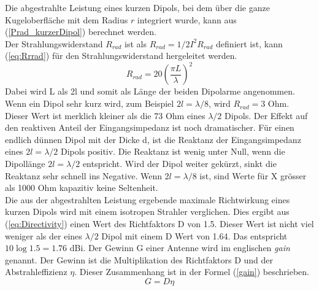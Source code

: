 Die abgestrahlte Leistung eines kurzen Dipols, bei dem über die ganze Kugeloberfläche mit dem Radius $r$ integriert wurde, kann aus  (\ref{Prad_kurzerDipol}) berechnet werden\cite{elliott1981antenna}.\\
Der Strahlungswiderstand $R_{rad}$ ist als $R_{rad}=1/2 I^{2}R_{rad}$ definiert ist, kann (\ref{eq:Rrrad}) für den Strahlungswiderstand hergeleitet werden\cite{Emant}.
\begin{equation}\label{eq:Rrrad}
R_{rad}=20 \left(\frac{\pi L}{\lambda} \right) ^{2}
\end{equation}
Dabei wird L als 2l und somit als Länge der beiden Dipolarme angenommen.
Wenn ein Dipol sehr kurz wird, zum Beispiel $2l=\lambda/8$,  wird $R_{rad} = 3$ Ohm. Dieser Wert ist merklich kleiner als   die 73 Ohm   eines $\lambda/2$ Dipols. Der Effekt auf den reaktiven Anteil der Eingangsimpedanz ist noch dramatischer. Für einen endlich dünnen Dipol mit der Dicke d, ist die Reaktanz der Eingangsimpedanz eines $2l=\lambda/2$ Dipols positiv. Die Reaktanz ist wenig unter Null, wenn die Dipollänge  $2l=\lambda/2$ entspricht. Wird der Dipol weiter gekürzt,  sinkt die Reaktanz sehr schnell ins Negative. Wenn  $2l=\lambda/8$ ist,  sind Werte für X grösser als 1000 Ohm kapazitiv keine Seltenheit\cite{elliott1981antenna}. \\

Die aus der abgestrahlten Leistung ergebende maximale Richtwirkung eines kurzen Dipols wird  mit einem isotropen Strahler verglichen. Dies ergibt aus  (\ref{eq:Directivity}) einen Wert des Richtfaktors D von 1.5. Dieser Wert ist nicht viel weniger als der eines $\lambda/2$ Dipol mit einem D Wert von 1.64. Das entspricht $10\log{1.5}=1.76$ dBi. Der Gewinn G einer Antenne wird im englischen \textit{gain} genannt. Der Gewinn ist die Multiplikation des Richtfaktors D und der Abstrahleffizienz $\eta$. Dieser Zusammenhang ist in der Formel (\ref{gain}) beschrieben.
\begin{equation}\label{gain}
G=D\eta
\end{equation}




